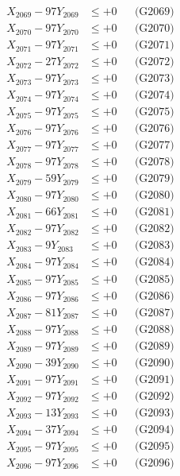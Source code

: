 \documentclass[a4paper,10pt]{article}
\begin{document}
{\begin{align}
X_{2069} - 97Y_{2069} &\leq +0 && \text{(G2069)} \\
X_{2070} - 97Y_{2070} &\leq +0 && \text{(G2070)} \\
\allowbreak
X_{2071} - 97Y_{2071} &\leq +0 && \text{(G2071)} \\
X_{2072} - 27Y_{2072} &\leq +0 && \text{(G2072)} \\
X_{2073} - 97Y_{2073} &\leq +0 && \text{(G2073)} \\
X_{2074} - 97Y_{2074} &\leq +0 && \text{(G2074)} \\
X_{2075} - 97Y_{2075} &\leq +0 && \text{(G2075)} \\
X_{2076} - 97Y_{2076} &\leq +0 && \text{(G2076)} \\
X_{2077} - 97Y_{2077} &\leq +0 && \text{(G2077)} \\
X_{2078} - 97Y_{2078} &\leq +0 && \text{(G2078)} \\
X_{2079} - 59Y_{2079} &\leq +0 && \text{(G2079)} \\
X_{2080} - 97Y_{2080} &\leq +0 && \text{(G2080)} \\
\allowbreak
X_{2081} - 66Y_{2081} &\leq +0 && \text{(G2081)} \\
X_{2082} - 97Y_{2082} &\leq +0 && \text{(G2082)} \\
X_{2083} - 9Y_{2083} &\leq +0 && \text{(G2083)} \\
X_{2084} - 97Y_{2084} &\leq +0 && \text{(G2084)} \\
X_{2085} - 97Y_{2085} &\leq +0 && \text{(G2085)} \\
X_{2086} - 97Y_{2086} &\leq +0 && \text{(G2086)} \\
X_{2087} - 81Y_{2087} &\leq +0 && \text{(G2087)} \\
X_{2088} - 97Y_{2088} &\leq +0 && \text{(G2088)} \\
X_{2089} - 97Y_{2089} &\leq +0 && \text{(G2089)} \\
X_{2090} - 39Y_{2090} &\leq +0 && \text{(G2090)} \\
\allowbreak
X_{2091} - 97Y_{2091} &\leq +0 && \text{(G2091)} \\
X_{2092} - 97Y_{2092} &\leq +0 && \text{(G2092)} \\
X_{2093} - 13Y_{2093} &\leq +0 && \text{(G2093)} \\
X_{2094} - 37Y_{2094} &\leq +0 && \text{(G2094)} \\
X_{2095} - 97Y_{2095} &\leq +0 && \text{(G2095)} \\
X_{2096} - 97Y_{2096} &\leq +0 && \text{(G2096)} \\

\end{align}}
\end{document}

